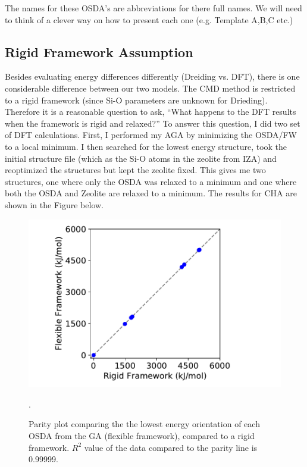 \documentclass[journal=accacs,manuscript=article, email=true, layout=traditional]{achemso}
\begin{document}
The names for these OSDA's are abbreviations for there full names. We will need to think of a clever way on how to present each one (e.g. Template A,B,C etc.)

\subsection{Rigid Framework Assumption}
\label{sec:orgfbcfdea}
Besides evaluating energy differences differently (Dreiding vs. DFT), there is one considerable difference between our two models. The CMD method is restricted to a rigid framework (since Si-O parameters are unknown for Drieding). Therefore it is a reasonable question to ask, ``What happens to the DFT results when the framework is rigid and relaxed?'' To answer this question, I did two set of DFT calculations. First, I performed my AGA by minimizing the OSDA/FW to a local minimum. I then searched for the lowest energy structure, took the initial structure file (which as the Si-O atoms in the zeolite from IZA) and reoptimized the structures but kept the zeolite fixed. This gives me two structures, one where only the OSDA was relaxed to a minimum and one where both the OSDA and Zeolite are relaxed to a minimum. The results for CHA are shown in the Figure below.

\begin{figure}
\begin{center}

\includegraphics[scale=.5,trim={0cm 0cm 0cm 0cm},clip]{./Figures/Framework-flex.pdf}
\caption{Parity plot comparing the the lowest energy orientation of each OSDA from the GA (flexible framework), compared to a rigid framework. $R^{2}$ value of the data compared to the parity line is 0.99999. }. 
\label{fig:Rig_v_Flex} 

\end{center}
\end{figure}
\end{document}
